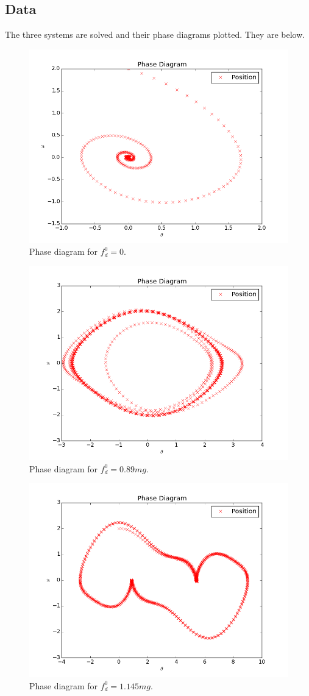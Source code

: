 \documentclass[10pt,letter]{article}
\begin{document}
\pagebreak
\subsection{Data}

The three systems are solved and their phase diagrams plotted. They are below.
\begin{figure}[h]
  \centering
    \includegraphics[width=.5\textwidth]{homework6_problem1_plot1}
  \caption{Phase diagram for $f_d^0 = 0$.}
\end{figure}

\begin{figure}[h]
  \centering
    \includegraphics[width=.5\textwidth]{homework6_problem1_plot3}
  \caption{Phase diagram for $f_d^0 = 0.89mg$.}
\end{figure}

\begin{figure}[h]
  \centering
    \includegraphics[width=.5\textwidth]{homework6_problem1_plot5}
  \caption{Phase diagram for $f_d^0 = 1.145mg$.}
\end{figure}
\end{document}
